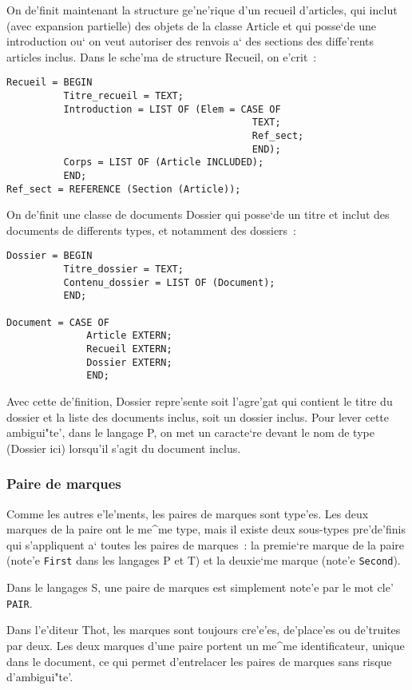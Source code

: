 {\begin{example}
On de'finit maintenant la structure ge'ne'rique d'un recueil d'articles,
qui inclut (avec expansion partielle) des objets de la classe Article
et qui posse`de une
introduction ou` on veut autoriser des renvois a` des sections des
diffe'rents articles inclus. Dans le sche'ma de structure Recueil,
on e'crit~:

\begin{verbatim}
Recueil = BEGIN
          Titre_recueil = TEXT;
          Introduction = LIST OF (Elem = CASE OF
                                           TEXT;
                                           Ref_sect;
                                           END);
          Corps = LIST OF (Article INCLUDED);
          END;
Ref_sect = REFERENCE (Section (Article));
\end{verbatim}

On de'finit une classe de documents Dossier qui posse`de un titre et
inclut des documents de differents types, et notamment des dossiers~:
\begin{verbatim}
Dossier = BEGIN
          Titre_dossier = TEXT;
          Contenu_dossier = LIST OF (Document);
          END;

Document = CASE OF
              Article EXTERN;
              Recueil EXTERN;
              Dossier EXTERN;
              END;
\end{verbatim}
Avec cette de'finition, Dossier repre'sente soit l'agre'gat qui
contient le titre du dossier et la liste des documents inclus, soit
un dossier inclus. Pour lever cette ambigui"te', dans le langage P,
on met un caracte`re {\tt *} devant le nom de type (Dossier ici)
lorsqu'il s'agit du document inclus.
\end{example}

\subsubsection{Paire de marques}
\label{paires}

Comme les autres e'le'ments, les paires de marques sont type'es. Les
deux marques de la paire ont le me^me type, mais il existe deux
sous-types pre'de'finis qui s'appliquent a` toutes les paires de marques~:
la premie`re marque de la paire (note'e {\tt First} dans les langages
P et T) et la deuxie`me marque (note'e {\tt Second}).

Dans le langages S, une paire de marques est simplement note'e par le
mot cle' {\tt PAIR}.

Dans l'e'diteur Thot, les marques sont toujours cre'e'es, de'place'es ou
de'truites par deux. Les deux marques d'une paire portent un me^me
identificateur, unique dans le document, ce qui permet d'entrelacer
les paires de marques sans risque d'ambigui"te'.

}
